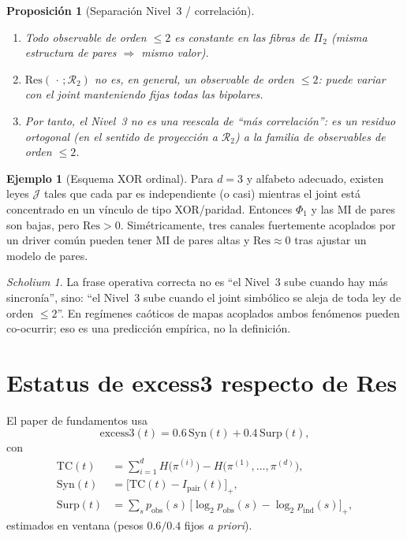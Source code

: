 \documentclass[11pt,a4paper]{article}
\theoremstyle{definition}
\newtheorem{example}{Ejemplo}[section]
\theoremstyle{plain}
\newtheorem{proposition}{Proposici\'on}[section]
\theoremstyle{remark}
\newtheorem{scholium}{Scholium}[section]
\newcommand{\Res}{\mathrm{Res}}
\newcommand{\TC}{\mathrm{TC}}
\newcommand{\Syn}{\mathrm{Syn}}
\newcommand{\Surp}{\mathrm{Surp}}
\newcommand{\excess}{\mathrm{excess3}}
\newcommand{\Rtwo}{\mathcal{R}_2}
\newcommand{\Jwin}{\mathcal{J}}
\begin{document}
\begin{proposition}[Separaci\'on Nivel~3 / correlaci\'on]
\label{prop:not_corr}
\begin{enumerate}[label=(\roman*)]
  \item Todo observable de orden $\le 2$ es constante en las fibras de
  $\Pi_2$ (misma estructura de pares $\Rightarrow$ mismo valor).
  \item $\Res(\,\cdot\,;\Rtwo)$ no es, en general, un observable de
  orden $\le 2$: puede variar con el joint manteniendo fijas todas las
  bipolares.
  \item Por tanto, el Nivel~3 no es una reescala de ``m\'as
  correlaci\'on'': es un residuo \emph{ortogonal} (en el sentido de
  proyecci\'on a $\Rtwo$) a la familia de observables de orden $\le 2$.
\end{enumerate}
\end{proposition}

\begin{example}[Esquema XOR ordinal]
\label{ex:xor}
Para $d=3$ y alfabeto adecuado, existen leyes $\Jwin$ tales que cada par
es independiente (o casi) mientras el joint est\'a concentrado en un
v\'inculo de tipo XOR/paridad. Entonces $\Phi_1$ y las MI de pares son
bajas, pero $\Res>0$. Sim\'etricamente, tres canales fuertemente
acoplados por un driver com\'un pueden tener MI de pares altas y
$\Res\approx 0$ tras ajustar un modelo de pares.
\end{example}

\begin{scholium}
La frase operativa correcta no es ``el Nivel~3 sube cuando hay m\'as
sincron\'ia'', sino: ``el Nivel~3 sube cuando el joint simb\'olico se
aleja de toda ley de orden $\le 2$''. En reg\'imenes ca\'oticos de mapas
acoplados ambos fen\'omenos pueden co-ocurrir; eso es una predicci\'on
emp\'irica, no la definici\'on.
\end{scholium}

\section{Estatus de excess3 respecto de Res}
\label{sec:excess3}

El paper de fundamentos usa
\begin{equation}
\label{eq:excess3}
\excess(t)=0.6\,\Syn(t)+0.4\,\Surp(t),
\end{equation}
con
\begin{align}
\TC(t)
&=\sum_{i=1}^d H\bigl(\pi^{(i)}\bigr)
-H\bigl(\pi^{(1)},\ldots,\pi^{(d)}\bigr),\\
\Syn(t)
&=\bigl[\TC(t)-I_{\mathrm{pair}}(t)\bigr]_+,\\
\Surp(t)
&=\sum_s p_{\mathrm{obs}}(s)\,
\bigl[\log_2 p_{\mathrm{obs}}(s)-\log_2 p_{\mathrm{ind}}(s)\bigr]_+,
\end{align}
estimados en ventana (pesos $0.6/0.4$ fijos \emph{a priori}).
\end{document}
